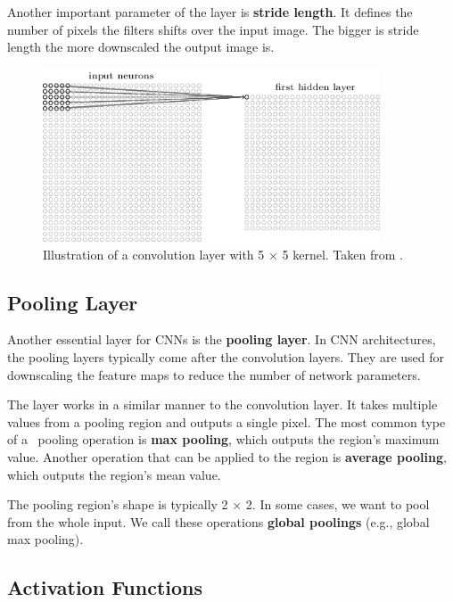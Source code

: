 Another important parameter of the layer is \textbf{stride length}. It defines the number of pixels the filters shifts over the input image. The bigger is stride length the more downscaled the output image is.


\begin{figure}[h]
    \centering
    \includegraphics[width=10cm]{Sources/Figures/convolution.png}
    \caption{Illustration of a convolution layer with 5 $\times$ 5 kernel. Taken from \cite{nielsenneural}.}
    \label{fig:convolution}
\end{figure}

\subsection{Pooling Layer}
Another essential layer for CNNs is the \textbf{pooling layer}. In CNN architectures, the pooling layers typically come after the convolution layers. They are used for downscaling the feature maps to reduce the number of network parameters. 

The layer works in a similar manner to the convolution layer. It takes multiple values from a pooling region and outputs a single pixel. The most common type of a~ pooling operation is \textbf{max pooling}, which outputs the region's maximum value. Another operation that can be applied to the region is \textbf{average pooling}, which outputs the region's mean value.

The pooling region's shape is typically 2 $\times$ 2. In some cases, we want to pool from the whole input. We call these operations \textbf{global poolings} (e.g., global max pooling).

\subsection{Activation Functions}
\label{afunctions}

